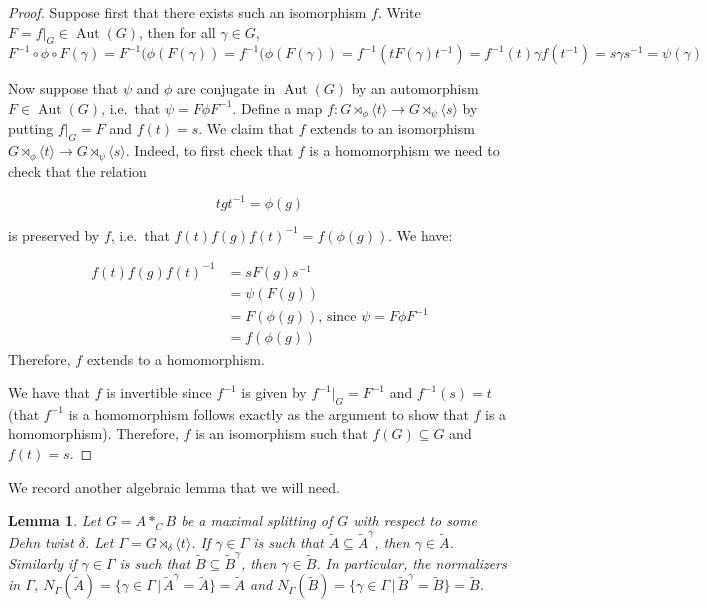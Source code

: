 \documentclass{amsart}
\DeclareMathOperator{\Aut}{Aut}
\theoremstyle{plain}
\newtheorem{lemma}[thm]{Lemma}
\theoremstyle{definition}
\theoremstyle{remark}
\begin{document}
\begin{proof}
    Suppose first that there exists such an isomorphism $f$. Write $F=f|_{G}\in \Aut(G)$, then for all $\gamma \in G$,
    \[
    F^{-1} \circ \phi \circ F (\gamma) = F^{-1}(\phi(F(\gamma)) =f^{-1}(\phi(F(\gamma))=
    f^{-1}(tF(\gamma)t^{-1})= f^{-1}(t) \gamma f(t^{-1}) =s\gamma s^{-1} = \psi(\gamma)
    \]

    Now suppose that $\psi$ and $\phi$ are conjugate in $\Aut(G)$ by an automorphism $F \in \Aut(G)$, i.e.\ that $\psi = F \phi F^{-1}$. Define a map $f: G \rtimes_{\phi} \langle t \rangle \to G \rtimes_{\psi} \langle s \rangle$ by putting $f \vert_G = F$ and $f(t) = s$. We claim that $f$ extends to an isomorphism $G \rtimes_{\phi} \langle t \rangle \to G \rtimes_{\psi} \langle s \rangle$. Indeed, to first check that $f$ is a homomorphism we need to check that the relation 

    $$tgt^{-1} = \phi(g)$$

    is preserved by $f$, i.e.\ that $f(t)f(g)f(t)^{-1} = f(\phi(g))$. We have: 

    \begin{align*}
        f(t)f(g)f(t)^{-1} &= s F(g) s^{-1} \\
        &= \psi(F(g)) \\
        &= F(\phi(g)) \text{, since $\psi = F\phi F^{-1}$}\\
        &= f(\phi(g))
    \end{align*}
    Therefore, $f$ extends to a homomorphism. 

    We have that $f$ is invertible since $f^{-1}$ is given by $f^{-1} \vert_G = F^{-1}$ and $f^{-1}(s) = t$ (that $f^{-1}$ is a homomorphism follows exactly as the argument to show that $f$ is a homomorphism). Therefore, $f$ is an isomorphism such that $f(G) \subseteq G$ and $f(t)=s$.
\end{proof}

We record another algebraic lemma that we will need. 

\begin{lemma}
    \label{lem:normalizer of A tilde}
    Let $G = A *_C B$ be a maximal splitting of $G$ with respect to some Dehn twist $\delta$. Let $\Gamma = G \rtimes_{\delta} \langle t \rangle$. If $\gamma \in \Gamma$ is such that $\tilde{A} \subseteq \tilde{A}^{\gamma}$, then $\gamma \in \tilde{A}$. Similarly if $\gamma \in \Gamma$ is such that $\tilde{B} \subseteq \tilde{B}^{\gamma}$, then $\gamma \in \tilde{B}$. In particular, the normalizers in $\Gamma$, $N_{\Gamma}(\tilde{A}) = \{\gamma \in \Gamma \, | \, \tilde{A}^{\gamma} = \tilde{A}\} =  \tilde{A}$ and $N_{\Gamma}(\tilde{B}) = \{\gamma \in \Gamma \, | \, \tilde{B}^{\gamma} = \tilde{B}\} = \tilde{B}$. 
\end{lemma}
\end{document}
